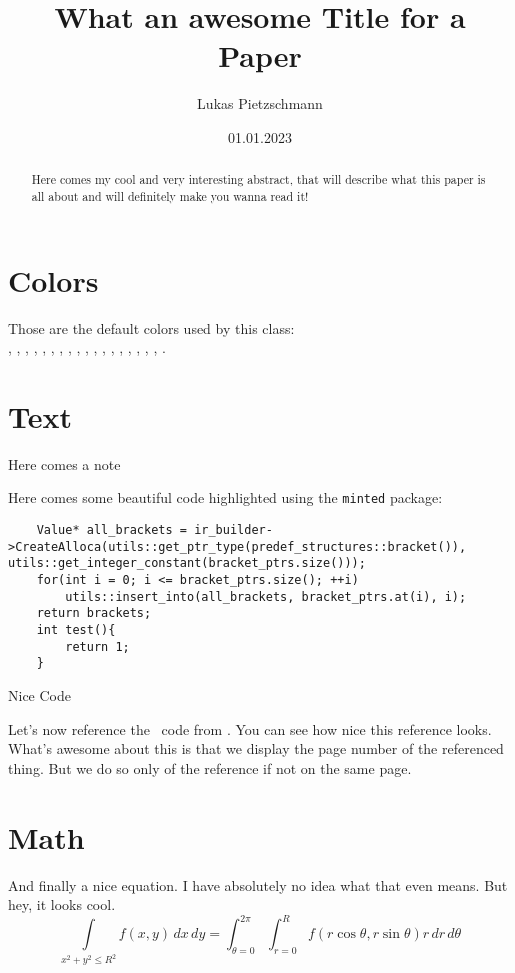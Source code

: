 \documentclass[english, sidenote, awesomeminted]{article}
\title{What an awesome Title for a Paper}
\author{Lukas Pietzschmann}
\date{01.01.2023}
\begin{document}
\maketitle

\begin{abstract}
	Here comes my cool and very interesting abstract, that will describe what this paper is all about
	and will definitely make you wanna read it!
	\lipsum[2-3]
\end{abstract}

\tableofcontents

\emptypage
\setcounter{page}{1}

\section{Colors}
Those are the default colors used by this class:\\
, , , , , ,
, , , , , ,
, , , , , , .

\section{Text}
\lipsum[1-3]
Here comes a note
\lipsum[1]
\par
Here comes some beautiful code highlighted using the \texttt{minted} package:
\begin{listing}[H]
\begin{verbatim}
	Value* all_brackets = ir_builder->CreateAlloca(utils::get_ptr_type(predef_structures::bracket()), utils::get_integer_constant(bracket_ptrs.size()));
	for(int i = 0; i <= bracket_ptrs.size(); ++i)
		utils::insert_into(all_brackets, bracket_ptrs.at(i), i);
	return brackets;
	int test(){
		return 1;
	}
\end{verbatim}
\caption{Nice Code}
\label{lst:test}
\end{listing}
\lipsum[1-4]\par
Let's now reference the \cpp~code from . You can see how nice this reference looks. What's awesome about this is that we display the page
number of the referenced thing. But we do so only of the reference if not on the same page.

\section{Math}
And finally a nice equation. I have absolutely no idea what that even means. But hey, it looks cool.
\begin{equation}
	\int\limits_{x^2 + y^2 \leq R^2}f(x,y)\,dx\,dy
	= \int_{\theta=0}^{2\pi} \int_{r=0}^R
	f(r\cos\theta,r\sin\theta) r\,dr\,d\theta
\end{equation}
\lipsum[1-2]

\begin{appendix}
\listoflistings
\end{appendix}
\end{document}
